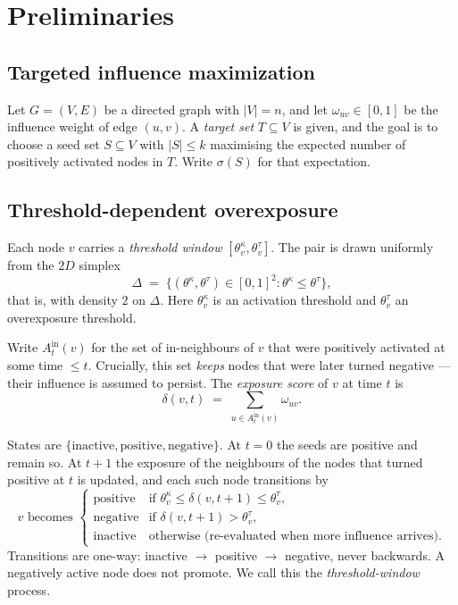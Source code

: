 \section{Preliminaries}
\label{sec:prelim}

\subsection{Targeted influence maximization}

Let $G = (V, E)$ be a directed graph with $|V| = n$, and let $\omega_{uv} \in [0,1]$ be the
influence weight of edge $(u,v)$. A \emph{target set} $T \subseteq V$ is given, and the goal is
to choose a seed set $S \subseteq V$ with $|S| \le k$ maximising the expected number of
positively activated nodes in $T$. Write $\sigma(S)$ for that expectation.

\subsection{Threshold-dependent overexposure}

Each node $v$ carries a \emph{threshold window} $[\theta^\kappa_v, \theta^\tau_v]$. The pair is
drawn uniformly from the $2D$ simplex
\begin{equation}
  \Delta \;=\; \bigl\{(\theta^\kappa, \theta^\tau) \in [0,1]^2 : \theta^\kappa \le \theta^\tau \bigr\},
  \label{eq:simplex}
\end{equation}
that is, with density $2$ on $\Delta$. Here $\theta^\kappa_v$ is an activation threshold and
$\theta^\tau_v$ an overexposure threshold.

Write $A^{\mathrm{in}}_t(v)$ for the set of in-neighbours of $v$ that were positively activated
at some time $\le t$. Crucially, this set \emph{keeps} nodes that were later turned negative ---
their influence is assumed to persist. The \emph{exposure score} of $v$ at time $t$ is
\begin{equation}
  \delta(v,t) \;=\; \sum_{u \in A^{\mathrm{in}}_t(v)} \omega_{uv}.
  \label{eq:delta}
\end{equation}

States are $\{\text{inactive}, \text{positive}, \text{negative}\}$. At $t=0$ the seeds are
positive and remain so. At $t+1$ the exposure of the neighbours of the nodes that turned
positive at $t$ is updated, and each such node transitions by
\begin{equation}
  v \text{ becomes } \begin{cases}
    \text{positive} & \text{if } \theta^\kappa_v \le \delta(v,t+1) \le \theta^\tau_v,\\[2pt]
    \text{negative} & \text{if } \delta(v,t+1) > \theta^\tau_v,\\[2pt]
    \text{inactive} & \text{otherwise (re-evaluated when more influence arrives).}
  \end{cases}
  \label{eq:transition}
\end{equation}
Transitions are one-way: inactive $\to$ positive $\to$ negative, never backwards. A negatively
active node does not promote. We call this the \emph{threshold-window} process.

